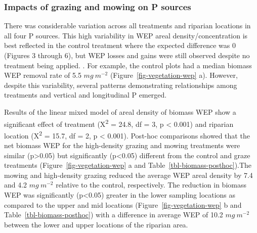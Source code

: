 \documentclass[
]{agujournal2019}
\begin{document}
\subsubsection{Impacts of grazing and mowing on P
sources}\label{impacts-of-grazing-and-mowing-on-p-sources}

There was considerable variation across all treatments and riparian
locations in all four P sources. This high variability in WEP areal
density/concentration is best reflected in the control treatment where
the expected difference was 0 (Figures 3 through 6), but WEP losses and
gains were still observed despite no treatment being applied. . For
example, the control plots had a median biomass WEP removal rate of 5.5
\(mg~m^{-2}\) (Figure~\ref{fig-vegetation-wep} a). However, despite this
variability, several patterns demonstrating relationships among
treatments and vertical and longitudinal P emerged.

Results of the linear mixed model of areal density of biomass WEP show a
significant effect of treatment (X\textsuperscript{2} = 24.8, df = 3, p
\textless{} 0.001) and riparian location (X\textsuperscript{2} = 15.7,
df = 2, p \textless{} 0.001). Post-hoc comparisons showed that the net
biomass WEP for the high-density grazing and mowing treatments were
similar (p\textgreater0.05) but significantly (p\textless0.05) different
from the control and graze treatments (Figure~\ref{fig-vegetation-wep} a
and Table~\ref{tbl-biomass-posthoc}).The mowing and high-density grazing
reduced the average WEP areal density by 7.4 and 4.2 \(mg~m^{-2}\)
relative to the control, respectively. The reduction in biomass WEP was
significantly (p\textless0.05) greater in the lower sampling locations
as compared to the upper and mid locations
(Figure~\ref{fig-vegetation-wep} b and Table~\ref{tbl-biomass-posthoc})
with a difference in average WEP of 10.2 \(mg~m^{-2}\) between the lower
and upper locations of the riparian area.
\end{document}
